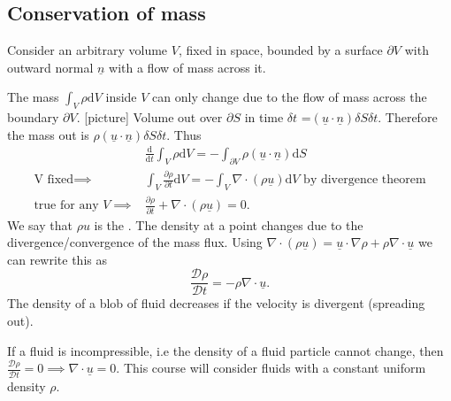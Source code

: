 \documentclass[a4paper]{scrartcl}
\renewcommand{\vec}[1]{\underline{#1}}
\begin{document}
\subsection{Conservation of mass}
Consider an arbitrary volume $V$, fixed in space, bounded by a surface $\partial V$ with outward normal $\vec{n}$ with a flow of mass across it.

The mass $\int_{V}^{}\rho  \mathrm{d}V $ inside $V$ can only change due to the flow of mass across the boundary $\partial V$.
[picture]
Volume out over $\partial S$ in time $\delta t$ =$(\vec{u}\cdot \vec{n})\delta S \delta t$. Therefore the mass out is $\rho(\vec{u}\cdot \vec{n})\delta S \delta t$. Thus
\begin{align*}
    &\frac{\mathrm{d}}{\mathrm{d}t} \int_{V}^{}\rho \mathrm{d}V =- \int_{\partial V}^{}\rho (\vec{u}\cdot \vec{n}) \mathrm{d}S\\
    \text{V fixed} \implies & \int_{V}^{}\frac{\partial \rho}{\partial t} \mathrm{d} V=-\int_{V}^{}\nabla \cdot (\rho \vec{u}) \mathrm{d}V \text{ by divergence theorem}\\ 
    \text{true for any } V \implies & \frac{\partial \rho}{\partial t} +\nabla \cdot (\rho \vec{u})=0.
\end{align*}
We say that $\rho u$ is the . The density at a point changes due to the divergence/convergence of the mass flux. Using $\nabla \cdot (\rho \vec{u})= \vec{u}\cdot \nabla \rho + \rho \nabla \cdot \vec{u}$ we can rewrite this as \[
\frac{\mathcal{D}\rho}{\mathcal{D}t}=-\rho \nabla \cdot \vec{u}
.\] The density of a blob of fluid decreases if the velocity is divergent (spreading out). 

If a fluid is incompressible, i.e the density of a fluid particle cannot change, then $\frac{\mathcal{D}\rho}{\mathcal{D}t}= 0 \implies \nabla \cdot \vec{u} =0$. This course will consider fluids with a constant uniform density $\rho$. 
\end{document}
